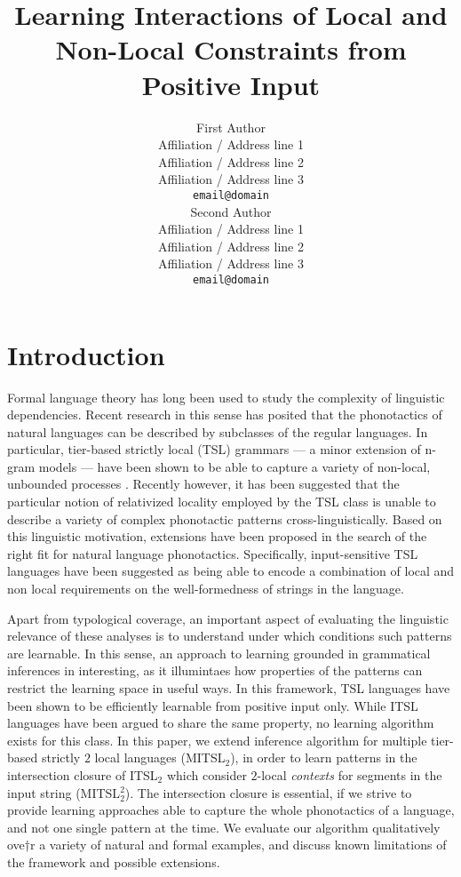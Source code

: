 \documentclass[11pt,a4paper]{article}
\title{Learning Interactions of Local and Non-Local Constraints from Positive Input}
\author{First Author \\
  Affiliation / Address line 1 \\
  Affiliation / Address line 2 \\
  Affiliation / Address line 3 \\
  \texttt{email@domain} \\\And
  Second Author \\
  Affiliation / Address line 1 \\
  Affiliation / Address line 2 \\
  Affiliation / Address line 3 \\
  \texttt{email@domain} \\}
\date{}
\begin{document}
\maketitle
\begin{abstract}
\end{abstract}


\section{Introduction}

Formal language theory has long been used to study the complexity of linguistic dependencies.
Recent research in this sense has posited that the phonotactics of natural languages can be described by subclasses of the regular languages.
In particular, tier-based strictly local (TSL) grammars  ---  a minor extension of n-gram models --- have been shown to be able to capture a variety of non-local, unbounded processes \cite{HeinzRawalTanner,McMullin16,McMullinHansson16}.
Recently however, it has been suggested that the particular notion of relativized locality employed by the TSL class is unable to describe a variety of complex phonotactic patterns cross-linguistically.
Based on this linguistic motivation, extensions have been proposed in the search of the right fit for natural language phonotactics.
Specifically, input-sensitive TSL languages have been suggested as being able to encode a combination of local and non local requirements on the well-formedness of strings in the language.

Apart from typological coverage, an important aspect of evaluating the linguistic relevance of these analyses is to understand under which conditions such patterns are learnable.
In this sense, an approach to learning grounded in grammatical inferences in interesting, as it illumintaes how properties of the patterns can restrict the learning space in useful ways.
In this framework, TSL languages have been shown to be efficiently learnable from positive input only.
While ITSL languages have been argued to share the same property, no learning algorithm exists for this class.
In this paper, we extend \citet{McMullinSCIL2019} inference algorithm for multiple tier-based strictly $2$ local languages (MITSL$_2$), in order to learn patterns in the intersection closure of ITSL$_2$ which consider $2$-local \emph{contexts} for segments in the input string (MITSL$^2_2$). 
The intersection closure is essential, if we strive to provide learning approaches able to capture the whole phonotactics of a language, and not one single pattern at the time.
We evaluate our algorithm qualitatively ove†r a variety of natural and formal examples, and discuss known limitations of the framework and possible extensions.
\end{document}
